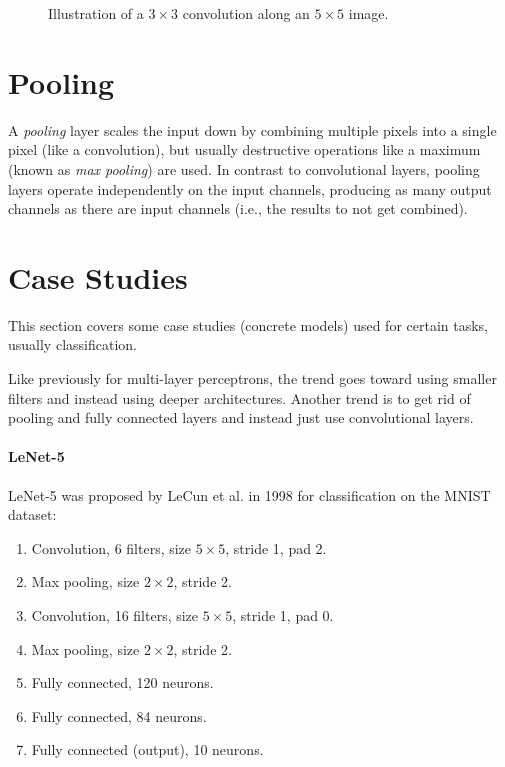 \begin{figure}
		\caption{Illustration of a \( 3 \times 3 \) convolution along an \( 5 \times 5 \) image.}
		\label{fig:convNoStrideNoPadding}
	\end{figure}

	\section{Pooling}
		A \emph{pooling} layer scales the input down by combining multiple pixels into a single pixel (like a convolution), but usually destructive operations like a maximum (known as \emph{max pooling}) are used. In contrast to convolutional layers, pooling layers operate independently on the input channels, producing as many output channels as there are input channels (i.e., the results to not get combined).

	\section{Case Studies}
		This section covers some case studies (concrete models) used for certain tasks, usually classification.

		Like previously for multi-layer perceptrons, the trend goes toward using smaller filters and instead using deeper architectures. Another trend is to get rid of pooling and fully connected layers and instead just use convolutional layers.

		\paragraph{LeNet-5}
			LeNet-5 was proposed by LeCun et al. in 1998 for classification on the MNIST dataset:
			\begin{enumerate}
				\item Convolution, \num{6} filters, size \(5 \times 5\), stride \num{1}, pad \num{2}.
				\item Max pooling, size \(2 \times 2\), stride \num{2}.
				\item Convolution, \num{16} filters, size \(5 \times 5\), stride \num{1}, pad \num{0}.
				\item Max pooling, size \(2 \times 2\), stride \num{2}.
				\item Fully connected, \num{120} neurons.
				\item Fully connected, \num{84} neurons.
				\item Fully connected (output), \num{10} neurons.
			\end{enumerate}

